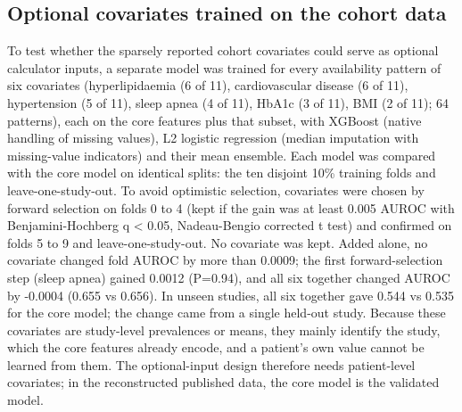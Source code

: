 \documentclass[journal]{IEEEtran}
\begin{document}
\subsection{Optional covariates trained on the cohort
data}\label{optional-covariates-trained-on-the-cohort-data}

To test whether the sparsely reported cohort covariates could serve as
optional calculator inputs, a separate model was trained for every
availability pattern of six covariates (hyperlipidaemia (6 of 11),
cardiovascular disease (6 of 11), hypertension (5 of 11), sleep apnea (4
of 11), HbA1c (3 of 11), BMI (2 of 11); 64 patterns), each on the core
features plus that subset, with XGBoost (native handling of missing
values), L2 logistic regression (median imputation with missing-value
indicators) and their mean ensemble. Each model was compared with the
core model on identical splits: the ten disjoint 10\% training folds and
leave-one-study-out. To avoid optimistic selection, covariates were
chosen by forward selection on folds 0 to 4 (kept if the gain was at
least 0.005 AUROC with Benjamini-Hochberg q \textless{} 0.05,
Nadeau-Bengio corrected t test) and confirmed on folds 5 to 9 and
leave-one-study-out. No covariate was kept. Added alone, no covariate
changed fold AUROC by more than 0.0009; the first forward-selection step
(sleep apnea) gained 0.0012 (P=0.94), and all six together changed AUROC
by -0.0004 (0.655 vs 0.656). In unseen studies, all six together gave
0.544 vs 0.535 for the core model; the change came from a single
held-out study. Because these covariates are study-level prevalences or
means, they mainly identify the study, which the core features already
encode, and a patient's own value cannot be learned from them. The
optional-input design therefore needs patient-level covariates; in the
reconstructed published data, the core model is the validated model.
\end{document}
